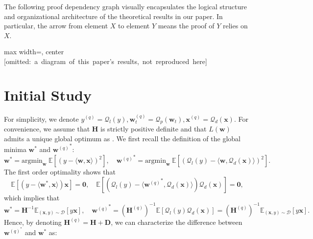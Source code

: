 \documentclass[11pt, letterpaper]{article}
\begin{document}
The following proof dependency graph visually encapsulates the logical structure and organizational architecture of the theoretical results in our paper. In particular, the arrow from element $X$ to element $Y$ means the proof of $Y$ relies on $X$.

\vspace{0.5cm}
\begin{adjustbox}{max width=\textwidth, center}
\mbox{[omitted: a diagram of this paper's results, not reproduced here]}
\end{adjustbox}

\newpage

\section{Initial Study}
\label{Initial Study}
For simplicity, we denote ${y}^{(q)}=\mathcal{Q}_l({y}), \mathbf{w}_t^{(q)}=\mathcal{Q}_p(\mathbf{w}_t),\mathbf{x}^{(q)}=\mathcal{Q}_d(\mathbf{x})$. For convenience, we assume that $\mathbf{H}$ is strictly positive definite and that $L(\mathbf{w})$ admits a unique global optimum as \citet{zou2023benign}. We first recall the definition of the global minima $\mathbf{w}^*$ and ${\mathbf{w}^{(q)}}^*$:
\begin{equation*}
    {\mathbf{w}}^* = \mathrm{argmin}_\mathbf{w} \ \mathbb{E}\left[(y-\langle \mathbf{w},\mathbf{x}\rangle)^2\right], \quad {\mathbf{w}^{(q)}}^* = \mathrm{argmin}_\mathbf{w} \ \mathbb{E}\left[(\mathcal{Q}_l(y)-\langle \mathbf{w},\mathcal{Q}_d(\mathbf{x})\rangle)^2\right].
\end{equation*}
The first order optimality shows that
\begin{equation}
    \label{definition w*}\mathbb{E}[(y-\langle{\mathbf{w}}^*,\mathbf{x}\rangle)\mathbf{x}]=\mathbf{0},\quad \mathbb{E}[(\mathcal{Q}_l(y)-\langle{\mathbf{w}^{(q)}}^*,\mathcal{Q}_d(\mathbf{x})\rangle)\mathcal{Q}_d(\mathbf{x})]=\mathbf{0},
\end{equation}
which implies that
\begin{equation*}
    \mathbf{w}^*=\mathbf{H}^{-1}\mathbb{E}_{(\mathbf{x},y)\sim\mathcal{D}}[y\mathbf{x}], \quad {\mathbf{w}^{(q)}}^*=(\mathbf{H}^{(q)})^{-1}\mathbb{E}\left[\mathcal{Q}_l(y)\mathcal{Q}_d(\mathbf{x})\right]=(\mathbf{H}^{(q)})^{-1}\mathbb{E}_{(\mathbf{x},y)\sim\mathcal{D}}[y\mathbf{x}].
\end{equation*}
Hence, by denoting $\mathbf{H}^{(q)}=\mathbf{H}+\mathbf{D}$, we can characterize the difference between $\mathbf{w}^{(q)^*}$ and $\mathbf{w}^*$ as:
\end{document}
